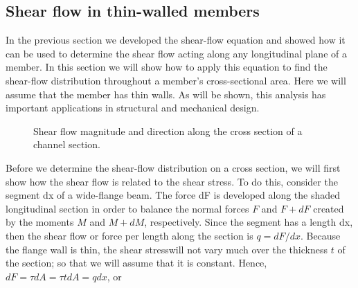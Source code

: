 \documentclass[
10pt,
a4paper,
openany,
svgnames,
]{book} %
\begin{document}
\subsection{Shear flow in thin-walled members}

In the previous section we developed the shear-flow equation and showed how it can be used to determine the shear flow acting along any longitudinal plane of a member. In this section we will show how to apply this equation to find the shear-flow distribution throughout a member’s cross-sectional area. Here we will assume that the member has thin walls. As will be shown, this analysis has important applications in structural and mechanical design.

\begin{figure}[h]
  \centering
  \caption{Shear flow magnitude and direction along the cross section of a channel section.}
\end{figure}

Before we determine the shear-flow distribution on a cross section, we will first show how the shear flow is related to the shear stress. To do this, consider the segment dx of a wide-flange beam. The force dF is developed along the shaded longitudinal section in order to balance the normal forces $F$ and $F + dF$ created by the moments $M$ and $M + dM$, respectively. Since the segment has a length dx, then the shear flow or force per length along the section is $q = dF/dx$. Because the flange wall is thin, the shear stresswill not vary much over the thickness $t$ of the section; so that we will assume that it is constant. Hence, $dF = \tau dA = \tau t dA = qdx$, or 
\end{document}
